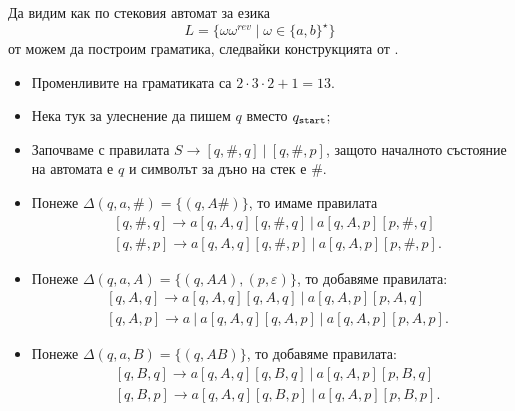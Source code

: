 \begin{example}
  Да видим как по стековия автомат за езика 
  \[L = \{\omega\omega^{rev} \mid \omega \in \{a,b\}^\star\}\]
  от  можем да построим граматика, следвайки конструкцията от .

  \begin{itemize}
  \item
    Променливите на граматиката са $2 \cdot 3 \cdot 2 + 1 = 13$.
  \item
    Нека тук за улеснение да пишем $q$ вместо $q_{\texttt{start}}$;
  \item 
    Започваме с правилата $S \to [q,\#,q]\ |\ [q,\#,p]$,
    защото началното състояние на автомата е $q$ и символът за дъно на стек е $\#$.
  \item
    Понеже $\Delta(q, a, \#) = \{(q, A\#)\}$, то имаме правилата
    \begin{align*}
      & [q, \#, q] \to a[q,A,q][q,\#,q]\ |\ a[q,A,p][p,\#,q]\\
      & [q, \#, p] \to a[q,A,q][q,\#,p]\ |\ a[q,A,p][p,\#,p].
    \end{align*}
  \item
    Понеже $\Delta(q, a, A) = \{(q, AA), (p, \varepsilon)\}$, то добавяме правилата:
    \begin{align*}
      & [q,A,q] \to a[q, A, q][q,A,q]\ |\ a[q,A,p][p,A,q]\\
      & [q,A,p] \to a\ |\ a[q, A, q][q,A,p]\ |\ a[q,A,p][p,A,p].
    \end{align*}
  \item
    Понеже $\Delta(q, a, B) = \{(q, AB)\}$, то добавяме правилата:
    \begin{align*}
      & [q, B, q] \to a[q,A,q][q,B,q]\ |\ a[q,A,p][p,B,q]\\
      & [q, B, p] \to a[q,A,q][q,B,p]\ |\ a[q,A,p][p,B,p].
    \end{align*}
  \end{itemize}
\end{example}

